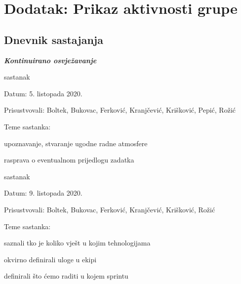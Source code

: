 \chapter*{Dodatak: Prikaz aktivnosti grupe}
		
		\section*{Dnevnik sastajanja}
		
		\textbf{\textit{Kontinuirano osvježavanje}}\\
		
		\begin{packed_enum}
			\item sastanak
			
			\item[] \begin{packed_item}
				\item Datum: 5. listopada 2020.
				\item Prisustvovali: Boltek, Bukovac, Ferković, Kranjčević, Krišković, Pepić, Rožić
				\item Teme sastanka:
				\begin{packed_item}
					\item  upoznavanje, stvaranje ugodne radne atmosfere
					\item  rasprava o eventualnom prijedlogu zadatka
				\end{packed_item}
			\end{packed_item}
			
			\item sastanak
			\item[] \begin{packed_item}
				\item Datum: 9. listopada 2020.
				\item Prisustvovali: Boltek, Bukovac, Ferković, Kranjčević, Krišković, Rožić
				\item Teme sastanka:
				\begin{packed_item}
					\item saznali tko je koliko vješt u kojim tehnologijama
					\item okvirno definirali uloge u ekipi
					\item definirali što ćemo raditi u kojem sprintu
				\end{packed_item}
			\end{packed_item}
		

\end{packed_enum}
